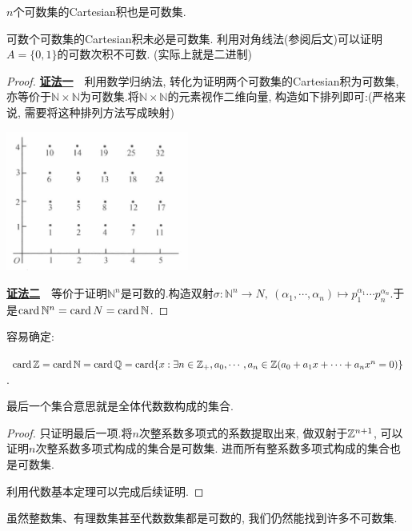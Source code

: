 \begin{proposition}{}
	$n$个可数集的Cartesian积也是可数集.
\end{proposition}
\begin{remark}
	可数个可数集的Cartesian积未必是可数集. 利用对角线法(参阅后文)可以证明$A=\{ 0, 1 \}$的可数次积不可数. (实际上就是二进制)
\end{remark}
\begin{proof}
	\underline{\textbf{证法一}}~~利用数学归纳法, 转化为证明两个可数集的Cartesian积为可数集, 亦等价于$\mathbb{N} \times \mathbb{N}$为可数集.将$\mathbb{N} \times \mathbb{N}$的元素视作二维向量, 构造如下排列即可:(严格来说, 需要将这种排列方法写成映射)
	\begin{center}
		\includegraphics[width=6cm]{attachment/iShot_2023-08-04_15.19.06.png}
	\end{center}
	
	\underline{\textbf{证法二}}~~等价于证明$\mathbb{N}^n$是可数的.构造双射$\sigma : \mathbb{N}^n \to N, ~(\alpha _1,  \cdots , \alpha _n) \mapsto p_1^{\alpha _1} \cdots p_n^{\alpha _n}$.于是$\operatorname{card} \mathbb{N}^n = \operatorname{card} N = \operatorname{card} \mathbb{N}$.
\end{proof}

容易确定: 

\begin{proposition}
	$\operatorname{card} \mathbb{Z} = \operatorname{card} \mathbb{N} = \operatorname{card} \mathbb{Q} = \operatorname{card} \{ x: \exists n \in \mathbb{Z}_+, a_0,  \cdots , a_n \in \mathbb{Z}(a_0+a_1x+\cdots +a_nx^n=0) \}$.
\end{proposition}
\begin{remark}
	最后一个集合意思就是全体代数数构成的集合.
\end{remark}
\begin{proof}
	只证明最后一项.将$n$次整系数多项式的系数提取出来, 做双射于$\mathbb{Z} ^{n+1}$, 可以证明$n$次整系数多项式构成的集合是可数集. 进而所有整系数多项式构成的集合也是可数集. 
	
	利用代数基本定理可以完成后续证明. 
\end{proof}

虽然整数集、有理数集甚至代数数集都是可数的, 我们仍然能找到许多不可数集.

